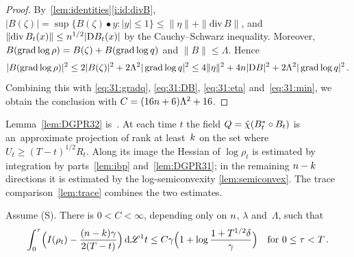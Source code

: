 \documentclass[a4paper,twoside,leqno]{article}
\begin{document}
\begin{proof}
    By~\ref{lem:identities}\ref{i:id:divB}, $|B(\zeta)| = \sup \{ B(\zeta) \bullet y : |y| \le 1 \}
    \le \|\eta\| + \|\mathrm{div}\, B\|$, and $\|\mathrm{div}\, B_t(x)\| \le n^{1/2} |\mathrm{D}
    B_t(x)|$ by the Cauchy--Schwarz inequality. Moreover, $B(\operatorname{grad} \log \rho) = B(\zeta) +
    B(\operatorname{grad} \log q)$ and $\|B\| \le \Lambda$. Hence
    \begin{displaymath}
        |B(\operatorname{grad} \log \rho)|^2 \le 2 |B(\zeta)|^2 + 2 \Lambda^2 |\operatorname{grad} \log q|^2 \le 4 \|\eta\|^2
        + 4 n |\mathrm{D} B|^2 + 2 \Lambda^2 |\operatorname{grad} \log q|^2 \,.
    \end{displaymath}
    Combining this with \eqref{eq:31:gradq}, \eqref{eq:31:DB}, \eqref{eq:31:eta}
    and~\eqref{eq:31:min}, we obtain the conclusion with $C = (16 n + 6) \Lambda^2 + 16$.
\end{proof}

\begin{miniremark}
    \label{mr:strategy32}
    Lemma~\ref{lem:DGPR32} is~\cite[Lemma~3.2]{DePhilippisGennaioliPigatiRindler2026}. At each
    time $t$ the field $Q = \hat\chi(B_t^{*} \circ B_t)$ is an~approximate projection of
    rank at least~$k$ on the set where $U_t \ge (T-t)^{1/2} R_t$. Along its image the Hessian
    of $\log \rho_t$ is estimated by integration by parts~\ref{lem:ibp} and~\ref{lem:DGPR31}; in
    the remaining $n - k$ directions it is estimated by the log-semiconvexity
    \ref{lem:semiconvex}. The trace comparison~\ref{lem:trace} combines the two estimates.
\end{miniremark}

\begin{lemma}
    \label{lem:DGPR32}
    Assume (S). There is $0 < C < \infty$, depending only on $n$, $\lambda$ and~$\Lambda$,
    such that
    \begin{displaymath}
        \int_0^\tau \Bigl( I(\rho_t) - \frac{(n - k) \gamma}{2 (T-t)} \Bigr) \,\mathrm{d} \mathscr{L}^1 t
        \le C \gamma \Bigl( 1 + \log \frac{1 + T^{1/2} \delta}{\gamma} \Bigr)
        \quad \text{for $0 \le \tau < T$} \,.
    \end{displaymath}
\end{lemma}
\end{document}
